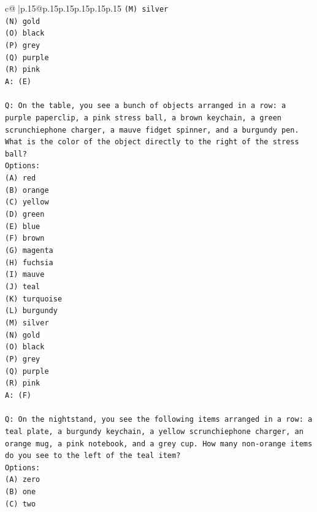 \documentclass{article}
\begin{document}
{\begin{supertabular}{c@{$\;$}|p{.15\linewidth}@{}p{.15\linewidth}p{.15\linewidth}p{.15\linewidth}p{.15\linewidth}p{.15\linewidth}}
{{{\texttt{(M) silver} \\
\texttt{(N) gold} \\
\texttt{(O) black} \\
\texttt{(P) grey} \\
\texttt{(Q) purple} \\
\texttt{(R) pink} \\
\texttt{A: (E)} \\
\\ 
\texttt{Q: On the table, you see a bunch of objects arranged in a row: a purple paperclip, a pink stress ball, a brown keychain, a green scrunchiephone charger, a mauve fidget spinner, and a burgundy pen. What is the color of the object directly to the right of the stress ball?} \\
\texttt{Options:} \\
\texttt{(A) red} \\
\texttt{(B) orange} \\
\texttt{(C) yellow} \\
\texttt{(D) green} \\
\texttt{(E) blue} \\
\texttt{(F) brown} \\
\texttt{(G) magenta} \\
\texttt{(H) fuchsia} \\
\texttt{(I) mauve} \\
\texttt{(J) teal} \\
\texttt{(K) turquoise} \\
\texttt{(L) burgundy} \\
\texttt{(M) silver} \\
\texttt{(N) gold} \\
\texttt{(O) black} \\
\texttt{(P) grey} \\
\texttt{(Q) purple} \\
\texttt{(R) pink} \\
\texttt{A: (F)} \\
\\ 
\texttt{Q: On the nightstand, you see the following items arranged in a row: a teal plate, a burgundy keychain, a yellow scrunchiephone charger, an orange mug, a pink notebook, and a grey cup. How many non{-}orange items do you see to the left of the teal item?} \\
\texttt{Options:} \\
\texttt{(A) zero} \\
\texttt{(B) one} \\
\texttt{(C) two} \\
}}}
\end{supertabular}}
\end{document}
